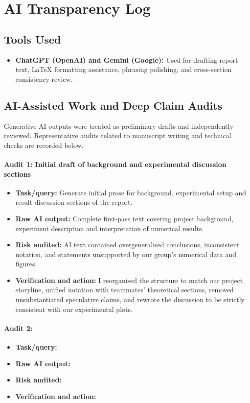 \section{AI Transparency Log}
\label{app:ai_log}

\subsection*{Tools Used}
\begin{itemize}[leftmargin=1.5em, itemsep=2pt]
    \item \textbf{ChatGPT (OpenAI) and Gemini (Google):} Used for drafting report text, LaTeX formatting assistance, phrasing polishing, and cross-section consistency review.
\end{itemize}

\subsection*{AI-Assisted Work and Deep Claim Audits}
Generative AI outputs were treated as preliminary drafts and independently reviewed. Representative audits related to manuscript writing and technical checks are recorded below.

\paragraph{Audit 1: Initial draft of background and experimental discussion sections}
\begin{itemize}[leftmargin=1.5em, itemsep=2pt]
    \item \textbf{Task/query:} Generate initial prose for background, experimental setup and result discussion sections of the report.
    \item \textbf{Raw AI output:} Complete first-pass text covering project background, experiment description and interpretation of numerical results.
    \item \textbf{Risk audited:} AI text contained overgeneralised conclusions, inconsistent notation, and statements unsupported by our group’s numerical data and figures.
    \item \textbf{Verification and action:} I reorganised the structure to match our project storyline, unified notation with teammates’ theoretical sections, removed unsubstantiated speculative claims, and rewrote the discussion to be strictly consistent with our experimental plots.
\end{itemize}

\paragraph{Audit 2:}
\begin{itemize}[leftmargin=1.5em, itemsep=2pt]
    \item \textbf{Task/query:}
    \item \textbf{Raw AI output:}
    \item \textbf{Risk audited:}
    \item \textbf{Verification and action:}
\end{itemize}

